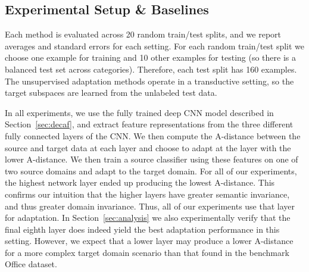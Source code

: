 \subsection{Experimental Setup \& Baselines}

 Each method is evaluated across 20 random train/test splits, and we report averages and standard errors for each setting. 
For each random train/test split we choose one example for training and 10 other examples for testing (so there is a balanced test set across categories). Therefore, each test split has 160 examples. The unsupervised adaptation methods operate in a transductive setting, so the target subspaces are learned from the unlabeled test data.

In all experiments, we use the fully trained deep CNN model described in Section~\ref{sec:decaf}, and extract feature representations from the three different fully connected layers of the CNN. We then compute the A-distance between the source and target data at each layer and choose to adapt at the layer with the lower A-distance. We then train a source classifier using these features on one of two source domains and adapt to the target domain. For all of our experiments, the highest network layer ended up producing the lowest A-distance.
This confirms our intuition that the higher layers have greater semantic invariance, and thus greater domain invariance. Thus, all of our experiments use that layer for adaptation.
In Section~\ref{sec:analysis} we also experimentally verify that the final eighth layer does indeed yield the best adaptation performance in this setting.
However, we expect that a lower layer may produce a lower A-distance for a more complex target domain scenario than that found in the benchmark Office dataset.




